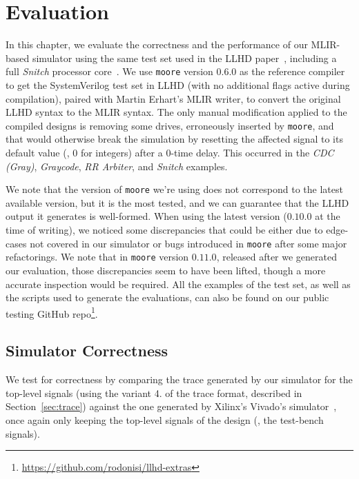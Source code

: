 \chapter{Evaluation}
\label{ch:eval}

In this chapter, we evaluate the correctness and the performance of our MLIR-based simulator using the same test set used in the LLHD paper~\cite{Schuiki2020}, including a full \textit{Snitch} processor core~\cite{Zaruba2020}. We use \texttt{moore} version $0.6.0$ as the reference compiler to get the SystemVerilog test set in LLHD (with no additional flags active during compilation), paired with Martin Erhart's MLIR writer, to convert the original LLHD syntax to the MLIR syntax. The only manual modification applied to the compiled designs is removing some drives, erroneously inserted by \texttt{moore}, and that would otherwise break the simulation by resetting the affected signal to its default value (\eg, $0$ for integers) after a $0$-time delay. This occurred in the \textit{CDC (Gray)}, \textit{Graycode}, \textit{RR Arbiter}, and \textit{Snitch} examples.

We note that the version of \texttt{moore} we're using does not correspond to the latest available version, but it is the most tested, and we can guarantee that the LLHD output it generates is well-formed. When using the latest version ($0.10.0$ at the time of writing), we noticed some discrepancies that could be either due to edge-cases not covered in our simulator or bugs introduced in \texttt{moore} after some major refactorings. We note that in \texttt{moore} version $0.11.0$, released after we generated our evaluation, those discrepancies seem to have been lifted, though a more accurate inspection would be required. All the examples of the test set, as well as the scripts used to generate the evaluations, can also be found on our public testing GitHub repo\footnote{\url{https://github.com/rodonisi/llhd-extras}}.


\section{Simulator Correctness}
\label{sec:correctness}
We test for correctness by comparing the trace generated by our simulator for the top-level signals (using the variant 4. of the trace format, described in Section~\ref{sec:trace}) against the one generated by Xilinx's Vivado's simulator~\cite{vivado}, once again only keeping the top-level signals of the design (\ie, the test-bench signals).

